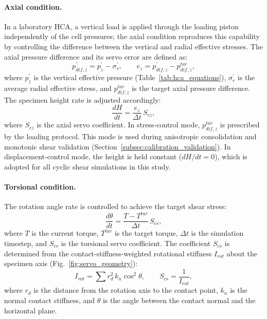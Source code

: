 \paragraph{Axial condition.}
In a laboratory HCA, a vertical load is applied through the loading piston independently of the cell pressures; the axial condition reproduces this capability by controlling the difference between the vertical and radial effective stresses. The axial pressure difference and its servo error are defined as:
\begin{equation}
p_{dif,z}^{\prime} = p_z^{\prime} - \sigma_r^{\prime}, \qquad e_z = p_{dif,z}^{\prime} - p_{dif,z}^{tar},
\label{eq:cond2_axial}
\end{equation}
where $p_z^{\prime}$ is the vertical effective pressure (Table~\ref{tab:hca_equations}), $\sigma_r^{\prime}$ is the average radial effective stress, and $p_{dif,z}^{tar}$ is the target axial pressure difference. The specimen height rate is adjusted accordingly:
\begin{equation}
\frac{dH}{dt} = \frac{e_z}{\Delta t}\,S_{cz},
\label{eq:servo_axial}
\end{equation}
where $S_{cz}$ is the axial servo coefficient. In stress-control mode, $p_{dif,z}^{tar}$ is prescribed by the loading protocol. This mode is used during anisotropic consolidation and monotonic shear validation (Section~\ref{subsec:calibration_validation}). In displacement-control mode, the height is held constant ($dH/dt = 0$), which is adopted for all cyclic shear simulations in this study.

\paragraph{Torsional condition.}
The rotation angle rate is controlled to achieve the target shear stress:
\begin{equation}
\frac{d\theta}{dt} = \frac{T - T^{tar}}{\Delta t}\,S_{cs},
\label{eq:cond3_torsion}
\end{equation}
where $T$ is the current torque, $T^{tar}$ is the target torque, $\Delta t$ is the simulation timestep, and $S_{cs}$ is the torsional servo coefficient. The coefficient $S_{cs}$ is determined from the contact-stiffness-weighted rotational stiffness $I_{rot}$ about the specimen axis (Fig.~\ref{fig:servo_geometry}):
\begin{equation}
I_{rot} = \sum r_d^2\,k_n\cos^2\!\theta, \qquad S_{cs} = \frac{1}{I_{rot}},
\label{eq:irot_scs}
\end{equation}
where $r_d$ is the distance from the rotation axis to the contact point, $k_n$ is the normal contact stiffness, and $\theta$ is the angle between the contact normal and the horizontal plane.


